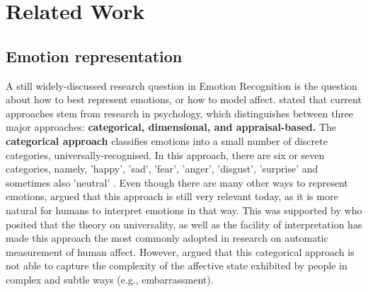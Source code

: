
\chapter{Related Work}

\section{Emotion representation}
A still widely-discussed research question in Emotion Recognition is the question about how to best represent emotions, or how to model affect. \citet{Gunes:2011:EmotionRepresentationContinuous} stated that current approaches stem from research in psychology, which distinguishes between three major approaches: \textbf{categorical, dimensional, and appraisal-based.}
\newline\newline
The \textbf{categorical approach} classifies emotions into a small number of discrete categories, universally-recognised. In this approach, there are six or seven categories, namely, 'happy', 'sad', 'fear', 'anger', 'disgust', 'surprise' and sometimes also 'neutral' \citep{Hupont:2010:FacialEmotionsIn2DAffectiveSpace}. Even though there are many other ways to represent emotions, \citet{Salah:2018:VideoBasedER} argued that this approach is still very relevant today, as it is more natural for humans to interpret emotions in that way. This was supported by \citet{Gunes:2011:EmotionRepresentationContinuous} who posited that the theory on universality, as well as the facility of interpretation has made this approach the most commonly adopted in research on automatic measurement of human affect.
\newline\newline
However, \citet{Gunes:2011:EmotionRepresentationContinuous} argued that this categorical approach is not able to capture the complexity of the affective state exhibited by people in complex and subtle ways (e.g., embarrassment).
